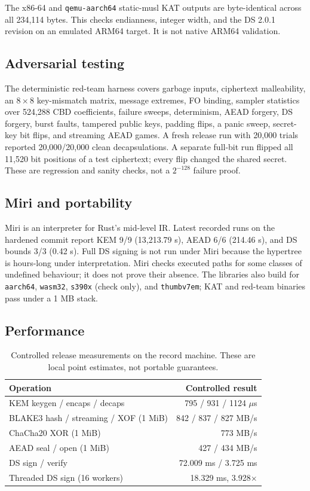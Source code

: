 \documentclass[runningheads]{llncs}
\begin{document}
The x86-64 and \texttt{qemu-aarch64} static-musl KAT outputs are
byte-identical across all 234,114 bytes.  This checks endianness,
integer width, and the DS 2.0.1 revision on an emulated ARM64 target.
It is not native ARM64 validation.

\subsection{Adversarial testing}

The deterministic red-team harness covers garbage inputs, ciphertext
malleability, an $8\times8$ key-mismatch matrix, message extremes, FO
binding, sampler statistics over 524,288 CBD coefficients, failure
sweeps, determinism, AEAD forgery, DS forgery, burst faults, tampered
public keys, padding flips, a panic sweep, secret-key bit flips, and
streaming AEAD games.  A fresh release run with 20,000 trials reported
20,000/20,000 clean decapsulations.  A separate full-bit run flipped all
11,520 bit positions of a test ciphertext; every flip changed the
shared secret.  These are regression and sanity checks, not a
$2^{-128}$ failure proof.

\subsection{Miri and portability}

Miri is an interpreter for Rust's mid-level IR.  Latest recorded runs
on the hardened commit report KEM 9/9 (13,213.79 s), AEAD 6/6
(214.46 s), and DS bounds 3/3 (0.42 s).  Full DS signing is not run
under Miri because the hypertree is hours-long under interpretation.
Miri checks executed paths for some classes of undefined behaviour; it
does not prove their absence.  The libraries also build for
\texttt{aarch64}, \texttt{wasm32}, \texttt{s390x} (check only), and
\texttt{thumbv7em}; KAT and red-team binaries pass under a 1 MB stack.

\subsection{Performance}

\begin{table}[t]
\centering
\small
\begin{tabular}{@{}lr@{}}
\toprule
Operation & Controlled result \\
\midrule
KEM keygen / encaps / decaps & 795 / 931 / 1124 $\mu$s \\
BLAKE3 hash / streaming / XOF (1 MiB) & 842 / 837 / 827 MB/s \\
ChaCha20 XOR (1 MiB) & 773 MB/s \\
AEAD seal / open (1 MiB) & 427 / 434 MB/s \\
DS sign / verify & 72.009 ms / 3.725 ms \\
Threaded DS sign (16 workers) & 18.329 ms, 3.928$\times$ \\
\bottomrule
\end{tabular}
\caption{Controlled release measurements on the record machine.
These are local point estimates, not portable guarantees.}
\label{tab:bench}
\end{table}
\end{document}
